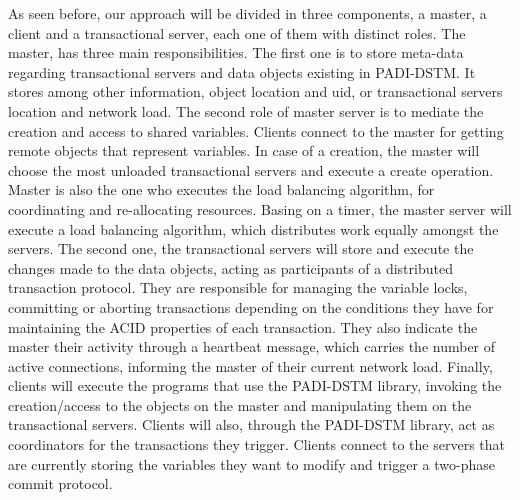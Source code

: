 \documentclass[times, 10pt,twocolumn]{article}
\begin{document}
As seen before, our approach will be divided in three components, a master, a client and a transactional server, each one of them with distinct roles.
The master, has three main responsibilities. The first one is to store meta-data regarding transactional servers and data objects existing in PADI-DSTM. It stores among other information, object location and uid, or transactional servers location and network load. The second role of master server is to mediate the creation and access to shared variables. Clients connect to the master for getting remote objects that represent variables. In case of a creation, the master will choose the most unloaded transactional servers and  execute a create operation. Master is also the one who executes the load balancing algorithm, for coordinating and re-allocating resources. Basing on a timer, the master server will execute a load balancing algorithm, which distributes work equally amongst the servers.
The second one, the transactional servers will store and execute the changes made to the data objects, acting as participants of a distributed transaction protocol. They are responsible for managing the variable locks, committing or aborting transactions depending on the conditions they have for maintaining the ACID properties of each transaction. They also indicate the master their activity through a heartbeat message, which carries the number of active connections, informing the master of their current network load.  
Finally, clients will execute the programs that use the PADI-DSTM library, invoking the creation/access to the objects on the master and manipulating them on the transactional servers. Clients will also, through the PADI-DSTM library, act as coordinators for the transactions they trigger. Clients connect to the servers that are currently storing the variables they want to modify and trigger a two-phase commit protocol.
\end{document}
